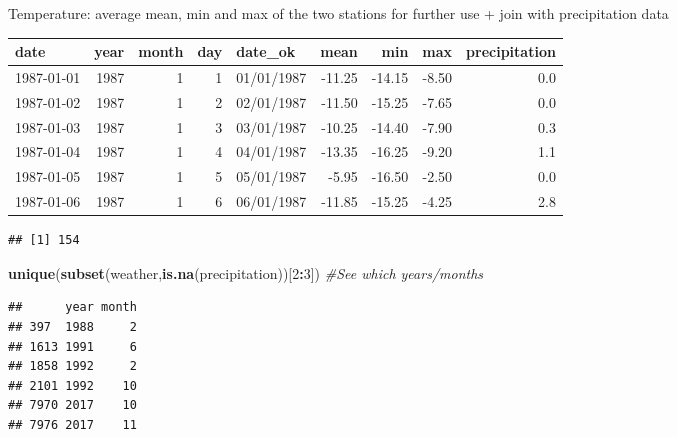 \documentclass[10pt,]{article}
\newenvironment{Shaded}{\begin{snugshade}}{\end{snugshade}}
\newcommand{\KeywordTok}[1]{\textcolor[rgb]{0.13,0.29,0.53}{\textbf{#1}}}
\newcommand{\DecValTok}[1]{\textcolor[rgb]{0.00,0.00,0.81}{#1}}
\newcommand{\CommentTok}[1]{\textcolor[rgb]{0.56,0.35,0.01}{\textit{#1}}}
\newcommand{\OperatorTok}[1]{\textcolor[rgb]{0.81,0.36,0.00}{\textbf{#1}}}
\newcommand{\NormalTok}[1]{#1}
\begin{document}
Temperature: average mean, min and max of the two stations for further
use + join with precipitation data

\begin{longtable}[]{@{}lrrrlrrrr@{}}
\toprule
date & year & month & day & date\_ok & mean & min & max &
precipitation\tabularnewline
\midrule
\endhead
1987-01-01 & 1987 & 1 & 1 & 01/01/1987 & -11.25 & -14.15 & -8.50 &
0.0\tabularnewline
1987-01-02 & 1987 & 1 & 2 & 02/01/1987 & -11.50 & -15.25 & -7.65 &
0.0\tabularnewline
1987-01-03 & 1987 & 1 & 3 & 03/01/1987 & -10.25 & -14.40 & -7.90 &
0.3\tabularnewline
1987-01-04 & 1987 & 1 & 4 & 04/01/1987 & -13.35 & -16.25 & -9.20 &
1.1\tabularnewline
1987-01-05 & 1987 & 1 & 5 & 05/01/1987 & -5.95 & -16.50 & -2.50 &
0.0\tabularnewline
1987-01-06 & 1987 & 1 & 6 & 06/01/1987 & -11.85 & -15.25 & -4.25 &
2.8\tabularnewline
\bottomrule
\end{longtable}

\begin{Shaded}
\end{Shaded}

\begin{verbatim}
## [1] 154
\end{verbatim}

\begin{Shaded}
\begin{Highlighting}[]
\KeywordTok{unique}\NormalTok{(}\KeywordTok{subset}\NormalTok{(weather,}\KeywordTok{is.na}\NormalTok{(precipitation))[}\DecValTok{2}\OperatorTok{:}\DecValTok{3}\NormalTok{]) }\CommentTok{#See which years/months}
\end{Highlighting}
\end{Shaded}

\begin{verbatim}
##      year month
## 397  1988     2
## 1613 1991     6
## 1858 1992     2
## 2101 1992    10
## 7970 2017    10
## 7976 2017    11
\end{verbatim}
\end{document}
